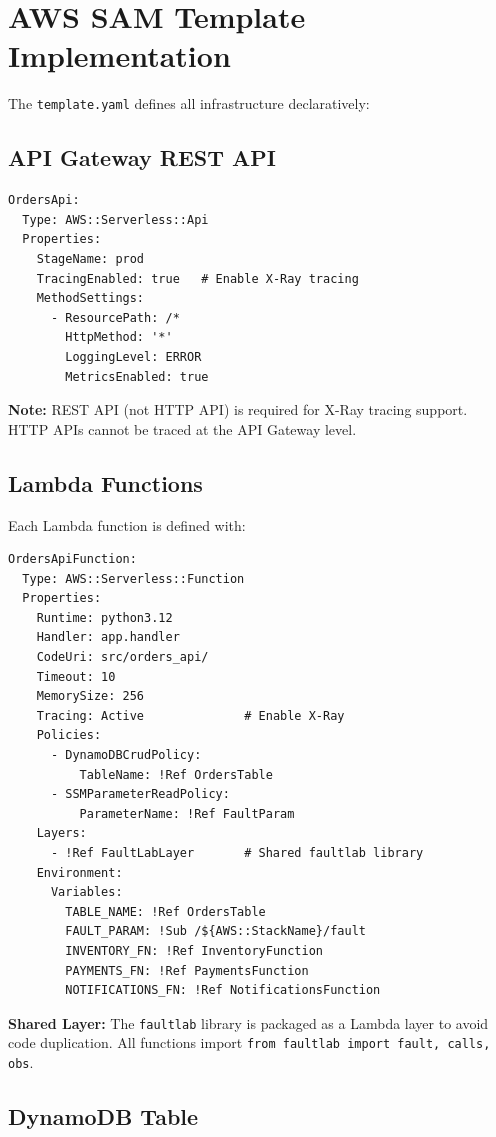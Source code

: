 \section{AWS SAM Template Implementation}

The \texttt{template.yaml} defines all infrastructure declaratively:

\subsection{API Gateway REST API}

\begin{verbatim}
OrdersApi:
  Type: AWS::Serverless::Api
  Properties:
    StageName: prod
    TracingEnabled: true   # Enable X-Ray tracing
    MethodSettings:
      - ResourcePath: /*
        HttpMethod: '*'
        LoggingLevel: ERROR
        MetricsEnabled: true
\end{verbatim}

\textbf{Note:} REST API (not HTTP API) is required for X-Ray tracing support. HTTP APIs cannot be traced at the API Gateway level.

\subsection{Lambda Functions}

Each Lambda function is defined with:

\begin{verbatim}
OrdersApiFunction:
  Type: AWS::Serverless::Function
  Properties:
    Runtime: python3.12
    Handler: app.handler
    CodeUri: src/orders_api/
    Timeout: 10
    MemorySize: 256
    Tracing: Active              # Enable X-Ray
    Policies:
      - DynamoDBCrudPolicy:
          TableName: !Ref OrdersTable
      - SSMParameterReadPolicy:
          ParameterName: !Ref FaultParam
    Layers:
      - !Ref FaultLabLayer       # Shared faultlab library
    Environment:
      Variables:
        TABLE_NAME: !Ref OrdersTable
        FAULT_PARAM: !Sub /${AWS::StackName}/fault
        INVENTORY_FN: !Ref InventoryFunction
        PAYMENTS_FN: !Ref PaymentsFunction
        NOTIFICATIONS_FN: !Ref NotificationsFunction
\end{verbatim}

\textbf{Shared Layer:} The \texttt{faultlab} library is packaged as a Lambda layer to avoid code duplication. All functions import \texttt{from faultlab import fault, calls, obs}.

\subsection{DynamoDB Table}


